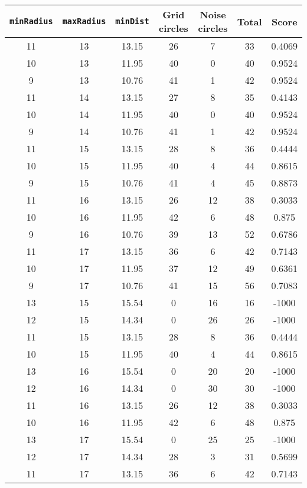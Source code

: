 \documentclass[letterpaper, 12pt]{article}
\begin{document}
\begin{longtable}{|c|c|c|c|c|c|c|}
\hline
\textbf{\texttt{minRadius}} & \textbf{\texttt{maxRadius}} & \textbf{\texttt{minDist}} & \textbf{Grid circles} & \textbf{Noise circles} & \textbf{Total} & \textbf{Score} \\
\hline
11 & 13 & 13.15 & 26 & 7 & 33 & 0.4069 \\
\hline
10 & 13 & 11.95 & 40 & 0 & 40 & 0.9524 \\
\hline
9 & 13 & 10.76 & 41 & 1 & 42 & 0.9524 \\
\hline
11 & 14 & 13.15 & 27 & 8 & 35 & 0.4143 \\
\hline
10 & 14 & 11.95 & 40 & 0 & 40 & 0.9524 \\
\hline
9 & 14 & 10.76 & 41 & 1 & 42 & 0.9524 \\
\hline
11 & 15 & 13.15 & 28 & 8 & 36 & 0.4444 \\
\hline
10 & 15 & 11.95 & 40 & 4 & 44 & 0.8615 \\
\hline
9 & 15 & 10.76 & 41 & 4 & 45 & 0.8873 \\
\hline
11 & 16 & 13.15 & 26 & 12 & 38 & 0.3033 \\
\hline
10 & 16 & 11.95 & 42 & 6 & 48 & 0.875 \\
\hline
9 & 16 & 10.76 & 39 & 13 & 52 & 0.6786 \\
\hline
11 & 17 & 13.15 & 36 & 6 & 42 & 0.7143 \\
\hline
10 & 17 & 11.95 & 37 & 12 & 49 & 0.6361 \\
\hline
9 & 17 & 10.76 & 41 & 15 & 56 & 0.7083 \\
\hline
13 & 15 & 15.54 & 0 & 16 & 16 & -1000 \\
\hline
12 & 15 & 14.34 & 0 & 26 & 26 & -1000 \\
\hline
11 & 15 & 13.15 & 28 & 8 & 36 & 0.4444 \\
\hline
10 & 15 & 11.95 & 40 & 4 & 44 & 0.8615 \\
\hline
13 & 16 & 15.54 & 0 & 20 & 20 & -1000 \\
\hline
12 & 16 & 14.34 & 0 & 30 & 30 & -1000 \\
\hline
11 & 16 & 13.15 & 26 & 12 & 38 & 0.3033 \\
\hline
10 & 16 & 11.95 & 42 & 6 & 48 & 0.875 \\
\hline
13 & 17 & 15.54 & 0 & 25 & 25 & -1000 \\
\hline
12 & 17 & 14.34 & 28 & 3 & 31 & 0.5699 \\
\hline
11 & 17 & 13.15 & 36 & 6 & 42 & 0.7143 \\

\end{longtable}
\end{document}
